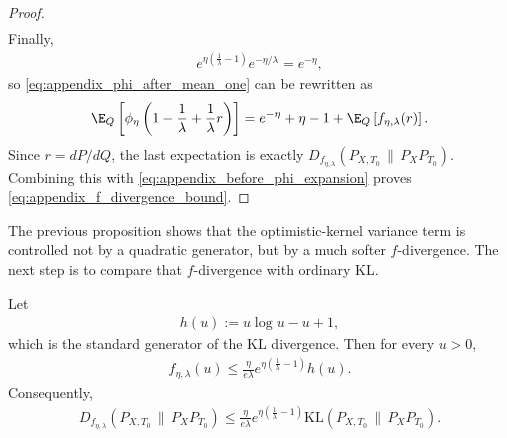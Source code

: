 \begin{proof}
\begin{align*}
\end{align*}
Finally,
\begin{align*}
    e^{\eta(\frac{1}{\lambda}-1)}e^{-\eta/\lambda}
    = e^{-\eta},
\end{align*}
so \eqref{eq:appendix_phi_after_mean_one} can be rewritten as
\begin{align*}
    \E_Q\left[\phi_\eta\left(1 - \frac{1}{\lambda} + \frac{1}{\lambda}r\right)\right]
    = e^{-\eta} + \eta - 1 + \E_Q\left[f_{\eta,\lambda}(r)\right].
\end{align*}
Since $r = dP/dQ$, the last expectation is exactly
$D_{f_{\eta,\lambda}}(P_{X,T_0}\,\|\,P_XP_{T_0})$. Combining this with
\eqref{eq:appendix_before_phi_expansion} proves \eqref{eq:appendix_f_divergence_bound}.
\end{proof}

The previous proposition shows that the optimistic-kernel variance term is controlled not by a quadratic generator, but by a much softer $f$-divergence.
The next step is to compare that $f$-divergence with ordinary KL.

\begin{proposition}
\label{prop:appendix_compare_f_to_kl}
Let
\begin{align}
    h(u) := u\log u - u + 1,
    \label{eq:appendix_kl_generator}
\end{align}
which is the standard generator of the KL divergence.
Then for every $u > 0$,
\begin{align}
    f_{\eta,\lambda}(u)
    \leq
    \frac{\eta}{e\lambda}e^{\eta(\frac{1}{\lambda}-1)} h(u).
    \label{eq:appendix_pointwise_f_vs_kl}
\end{align}
Consequently,
\begin{align}
    D_{f_{\eta,\lambda}}(P_{X,T_0}\,\|\,P_XP_{T_0})
    \leq
    \frac{\eta}{e\lambda}e^{\eta(\frac{1}{\lambda}-1)}
    \mathrm{KL}(P_{X,T_0}\,\|\,P_XP_{T_0}).
    \label{eq:appendix_f_vs_kl_divergence}
\end{align}
\end{proposition}


